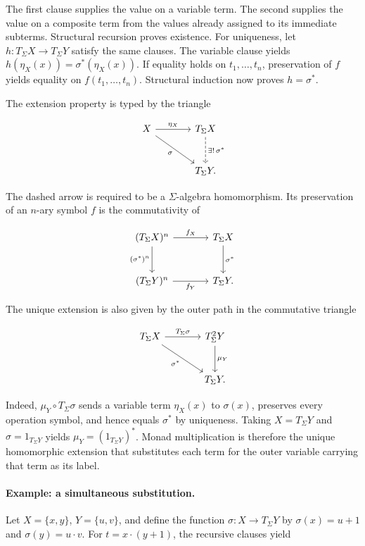 \documentclass[11pt]{article}
\theoremstyle{definition}
\begin{document}
The first clause supplies the value on a variable term. The second supplies the
value on a composite term from the values already assigned to its immediate
subterms. Structural recursion proves existence. For uniqueness, let
\(h:T_\Sigma X\to T_\Sigma Y\) satisfy the same clauses. The variable clause
yields \(h(\eta_X(x))=\sigma^*(\eta_X(x))\). If equality holds on
\(t_1,\ldots,t_n\), preservation of \(f\) yields equality on
\(f(t_1,\ldots,t_n)\). Structural induction now proves \(h=\sigma^*\).

The extension property is typed by the triangle

\[
\begin{tikzcd}[row sep=large,column sep=large]
X \arrow[r,"\eta_X"] \arrow[dr,"\sigma"'] &
T_\Sigma X \arrow[d,dashed,"{\exists!\,\sigma^*}"] \\
& T_\Sigma Y.
\end{tikzcd}
\]

The dashed arrow is required to be a \(\Sigma\)-algebra homomorphism. Its
preservation of an \(n\)-ary symbol \(f\) is the commutativity of

\[
\begin{tikzcd}[row sep=large,column sep=large]
(T_\Sigma X)^n \arrow[r,"f_X"] \arrow[d,"(\sigma^*)^n"'] &
T_\Sigma X \arrow[d,"\sigma^*"] \\
(T_\Sigma Y)^n \arrow[r,"f_Y"'] & T_\Sigma Y.
\end{tikzcd}
\]

The unique extension is also given by the outer path in the commutative
triangle

\[
\begin{tikzcd}[row sep=large,column sep=large]
T_\Sigma X \arrow[r,"T_\Sigma\sigma"] \arrow[dr,"\sigma^*"'] &
T_\Sigma^2Y \arrow[d,"\mu_Y"] \\
& T_\Sigma Y.
\end{tikzcd}
\]

Indeed, \(\mu_Y\circ T_\Sigma\sigma\) sends a variable term
\(\eta_X(x)\) to \(\sigma(x)\), preserves every operation symbol, and hence
equals \(\sigma^*\) by uniqueness. Taking
\(X=T_\Sigma Y\) and \(\sigma=1_{T_\Sigma Y}\) yields
\(\mu_Y=(1_{T_\Sigma Y})^*\). Monad multiplication is therefore the unique
homomorphic extension that substitutes each term for the outer variable
carrying that term as its label.

\paragraph{Example: a simultaneous substitution.}
Let \(X=\{x,y\}\), \(Y=\{u,v\}\), and define the function
\(\sigma:X\to T_\Sigma Y\) by
\(\sigma(x)=u+1\) and \(\sigma(y)=u\cdot v\). For
\(t=x\cdot(y+1)\), the recursive clauses yield
\end{document}
